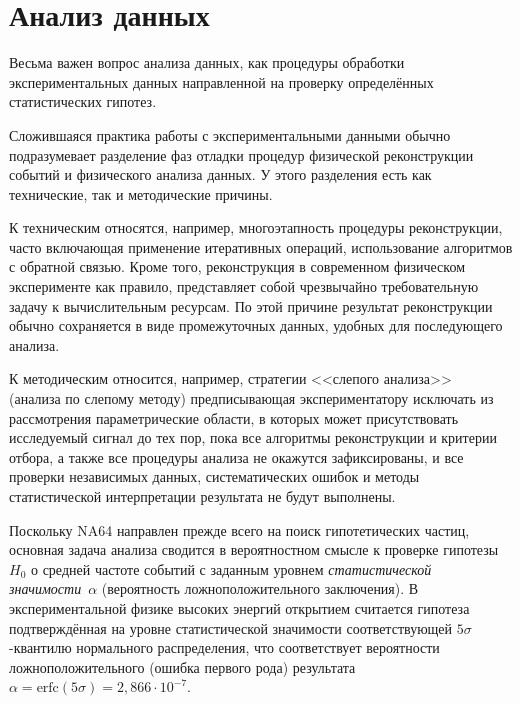\section{Анализ данных}

Весьма важен вопрос анализа данных,
как процедуры обработки экспериментальных данных
направленной на проверку определённых статистических гипотез.

Сложившаяся практика работы с экспериментальными
данными обычно подразумевает разделение фаз отладки процедур
физической реконструкции событий и физического анализа данных.
У этого разделения есть как технические, так и методические причины.

К техническим относятся, например, многоэтапность процедуры
реконструкции, часто включающая применение итеративных операций,
использование алгоритмов с обратной связью. Кроме того,
реконструкция в современном физическом эксперименте
как правило, представляет собой чрезвычайно требовательную задачу
к вычислительным ресурсам. По этой причине результат
реконструкции обычно сохраняется в виде промежуточных данных,
удобных для последующего анализа.

К методическим относится, например,
стратегии <<слепого анализа>>~\cite{blind-analysis} (анализа по слепому методу)
предписывающая экспериментатору исключать из рассмотрения
параметрические области, в которых может присутствовать исследуемый
сигнал до тех пор, пока все алгоритмы реконструкции и критерии отбора,
а также все процедуры анализа не окажутся
зафиксированы, и все проверки независимых данных, систематических
ошибок и методы статистической интерпретации результата не будут
выполнены.

Поскольку NA64 направлен прежде всего на поиск гипотетических частиц,
основная задача анализа сводится в вероятностном
смысле к проверке гипотезы $H_0$ о средней частоте событий с
заданным уровнем \emph{статистической значимости}~$\alpha$
(вероятность ложноположительного заключения).
В экспериментальной физике высоких энергий открытием считается
гипотеза подтверждённая на уровне статистической значимости
соответствующей $5\sigma$-квантилю нормального распределения,
что соответствует вероятности ложноположительного (ошибка первого рода)
результата~$\alpha =\text{erfc}(5\sigma) =2{,}866\cdot10^{-7}$.

